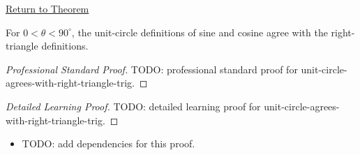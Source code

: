 \newpage
{}
\label{prf:unit-circle-agrees-with-right-triangle-trig}

\begin{remark*}[Return]
\hyperref[thm:unit-circle-agrees-with-right-triangle-trig]{Return to Theorem}
\end{remark*}

\begin{theorem*}
For $0<\theta<90^\circ$, the unit-circle definitions of sine and cosine agree
with the right-triangle definitions.
\end{theorem*}

\begin{proof}[Professional Standard Proof]
\LRAProofBodyStart
TODO: professional standard proof for unit-circle-agrees-with-right-triangle-trig.
\end{proof}

\begin{proof}[Detailed Learning Proof]
\LRAProofBodyStart
TODO: detailed learning proof for unit-circle-agrees-with-right-triangle-trig.
\end{proof}

\begin{remark*}
\end{remark*}

\begin{dependencies}
\begin{itemize}
  \item TODO: add dependencies for this proof.
\end{itemize}
\end{dependencies}

\clearpage
